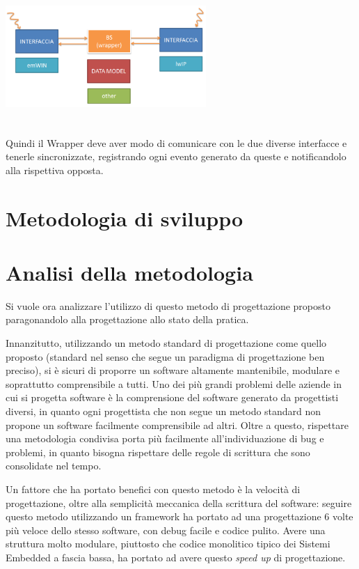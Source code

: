 \documentclass[journal]{IEEEtran}
\begin{document}
\includegraphics[width=3in,height=2in,clip,keepaspectratio]{Wrapper.png}

Quindi il Wrapper deve aver modo di comunicare con le due diverse interfacce e tenerle sincronizzate, registrando ogni evento generato da queste e notificandolo alla rispettiva opposta.


\section{Metodologia di sviluppo}

\section{Analisi della metodologia}

Si vuole ora analizzare l'utilizzo di questo metodo di progettazione proposto paragonandolo alla progettazione allo stato della pratica. 

Innanzitutto, utilizzando un metodo standard di progettazione come quello proposto (standard nel senso che segue un paradigma di progettazione ben preciso), si è sicuri di proporre un software altamente mantenibile, modulare e soprattutto comprensibile a tutti. Uno dei più grandi problemi delle aziende in cui si progetta software è la comprensione del software generato da progettisti diversi, in quanto ogni progettista che non segue un metodo standard non propone un software facilmente comprensibile ad altri. Oltre a questo, rispettare una metodologia condivisa porta più facilmente all'individuazione di bug e problemi, in quanto bisogna rispettare delle regole di scrittura che sono consolidate nel tempo.

Un fattore che ha portato benefici con questo metodo è la velocità di progettazione, oltre alla semplicità meccanica della scrittura del software: seguire questo metodo utilizzando un framework ha portato ad una progettazione 6 volte più veloce dello stesso software, con debug facile e codice pulito. Avere una struttura molto modulare, piuttosto che codice monolitico tipico dei Sistemi Embedded a fascia bassa, ha portato ad avere questo \textit{speed up} di progettazione.
\end{document}
